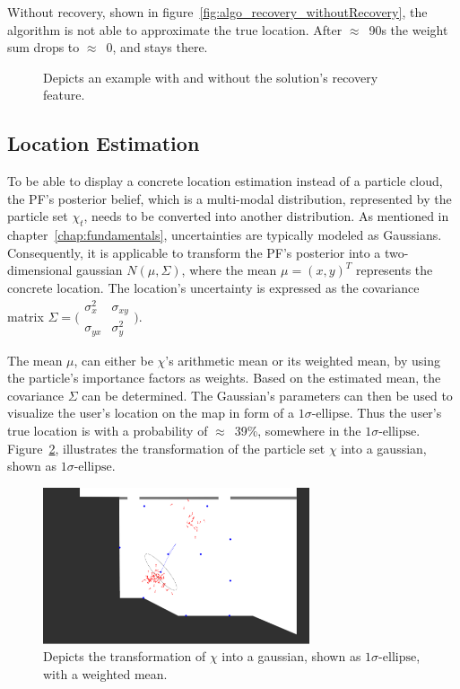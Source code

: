 Without recovery, shown in figure~\ref{fig:algo_recovery_withoutRecovery}, the algorithm is not able to approximate the true location. After $\approx$~90s the weight sum drops to $\approx$~0, and stays there.




\begin{figure}
	
	\caption {Depicts an example with and without the solution's recovery feature.}
	\label{fig:algo_recovery}
\end{figure}

\subsection{Location Estimation}\label{sec:algo_locEstimation}
To be able to display a concrete location estimation instead of a particle cloud, the \acs{PF}'s posterior belief, which is a multi-modal distribution, represented by the particle set $\chi_t$, needs to be converted into another distribution. As mentioned in chapter~\ref{chap:fundamentals}, uncertainties are typically modeled as Gaussians. Consequently, it is applicable to transform the \acs{PF}'s posterior into a two-dimensional gaussian $N(\mu, \Sigma)$, where the mean $\mu = (x, y)^T$ represents the concrete location. The location's uncertainty is expressed as the covariance matrix $\Sigma = \bigl(\begin{smallmatrix} \sigma_{x}^2&\sigma_{xy}\\ \sigma_{yx}&\sigma_{y}^2 \end{smallmatrix} \bigr)$.

The mean $\mu$, can either be $\chi$'s arithmetic mean or its weighted mean, by using the particle's importance factors as weights. Based on the estimated mean, the covariance $\Sigma$ can be determined. The Gaussian's parameters can then be used to visualize the user's location on the map in form of a $1\sigma\text{-ellipse}$. Thus the user's true location is with a probability of $\approx$~39\%, somewhere in the $1\sigma\text{-ellipse}$. Figure~\ref{fig:algo_sigellipse}, illustrates the transformation of the particle set $\chi$ into a gaussian, shown as $1\sigma\text{-ellipse}$.

\begin{figure}
	\includegraphics[width=0.7\textwidth]{figures/sigellipse}
	\caption{Depicts the transformation of $\chi$ into a gaussian, shown as $1\sigma\text{-ellipse}$, with a weighted mean.}
	\label{fig:algo_sigellipse}
\end{figure}
